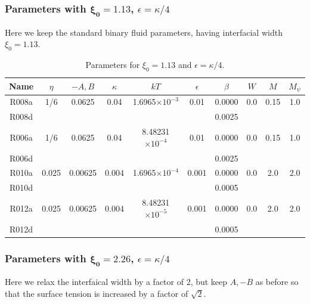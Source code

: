\subsubsection{Parameters with $\mathbf{\xi_0 = 1.13}$, $\epsilon = \kappa/4$}

Here we keep the standard binary fluid parameters, having interfacial
width $\xi_0 = 1.13$.

\begin{table}[h]
\begin{center}
\begin{tabular}{|c|c|c|c|c|c|c|c|c|c|}
\hline
Name & $\eta$ & $-A,B$ & $\kappa$ & $kT$ & $\epsilon$ & $\beta$ & $W$
     & $M$ & $M_\psi$\\
\hline
R008a & 1/6 & 0.0625 & 0.04 & 1.6965$\times 10^{-3}$ & 0.01 & 0.0000 & 0.0 
      & 0.15 & 1.0 \\
R008d &  &  &  & & & 0.0025 &  &  &  \\
\hline
R006a & 1/6 & 0.0625 & 0.04 & 8.48231$\times 10^{-4}$ & 0.01 & 0.0000 & 0.0 
      & 0.15 & 1.0 \\
R006d & &  &  &  & & 0.0025 &  &  &  \\
\hline
R010a & 0.025 & 0.00625 & 0.004 & 1.6965$\times 10^{-4}$ & 0.001
      & 0.0000 & 0.0 & 2.0 & 2.0 \\
R010d & &  &  &  & & 0.0005 &  &  &  \\
\hline
R012a & 0.025 & 0.00625 & 0.004 & 8.48231$\times 10^{-5}$ & 0.001
      & 0.0000 & 0.0 & 2.0 & 2.0 \\
R012d & &  &  &  & & 0.0005 &  &  &  \\
\hline
\end{tabular}
\caption{Parameters for $\xi_0 = 1.13$ and $\epsilon = \kappa/4$.}
\end{center}
\end{table}



\subsubsection{Parameters with $\mathbf{\xi_0 = 2.26}$, $\epsilon = \kappa/4$}

Here we relax the interfaical width by a factor of 2, but
keep $A,-B$ as before so that the surface tension is increased
by a factor of $\sqrt{2}$.

